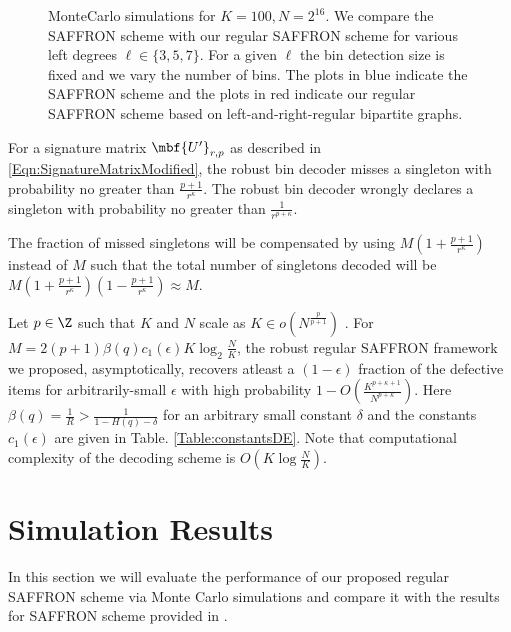 \documentclass[conference,,twocolumn]{IEEEtran}
\begin{document}
\begin{figure}[t!]
\centering
\resizebox{\columnwidth}{!}{}
\caption{MonteCarlo simulations for $K=100, N=2^{16}$. We compare the SAFFRON scheme with our regular SAFFRON scheme for various left degrees $\ell\in\{3,5,7\}$. For a given $\ell$ the bin detection size is fixed and we vary the number of bins. The plots in blue indicate the SAFFRON scheme and the plots in red indicate our regular SAFFRON scheme based on left-and-right-regular bipartite graphs.}
\label{Fig:SimulationNoiseless}
\end{figure}

\begin{lemma}
For a signature matrix $\mbf{U'}_{r,p}$ as described in \eqref{Eqn:SignatureMatrixModified}, the robust bin decoder misses a singleton with probability no greater than $\frac{p+1}{r^{\kappa}}$. The robust bin decoder wrongly declares a singleton with probability no greater than $\frac{1}{r^{p+\kappa}}$.
\end{lemma}
The fraction of missed singletons will be compensated by using $M(1+\frac{p+1}{r^{\kappa}})$ instead of $M$ such that the total number of singletons decoded will be $M(1+\frac{p+1}{r^{\kappa}})(1-\frac{p+1}{r^{\kappa}})\approx M$.

\begin{theorem}
Let $p\in\Z$ such that $K$ and $N$ scale as $K\in o\left(N^{\frac{p}{p+1}}\right)$
. For $M=2(p+1)\beta(q)c_1(\epsilon)K \log_{2}\frac{N}{K}$, the robust regular SAFFRON framework we proposed, asymptotically, recovers atleast a $(1-\epsilon)$ fraction of the defective items for arbitrarily-small $\epsilon$ with high probability $1-O\left(\frac{K^{p+\kappa+1}}{N^{p+\kappa}}\right)$. Here $\beta(q)=\frac{1}{R}>\frac{1}{1-H(q)-\delta}$ for an arbitrary small constant $\delta$ and the constants $c_1(\epsilon)$ are given in Table. \ref{Table:constantsDE}. Note that computational complexity of the decoding scheme is $O(K\log \frac{N}{K})$.
\end{theorem}

\section{Simulation Results}
In this section we will evaluate the performance of our proposed regular SAFFRON scheme via Monte Carlo simulations and compare it with the results for SAFFRON scheme provided in \cite{lee2015saffron}.
\end{document}
